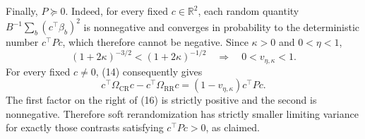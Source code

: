 Finally, \(P\succeq0\).  Indeed, for every fixed \(c\in\mathbb R^2\), each random quantity
\(
 B^{-1}\sum_b(c^\top\beta_b)^2
\)
is nonnegative and converges in probability to the deterministic number \(c^\top Pc\), which therefore cannot be negative.  Since \(\kappa>0\) and \(0<\eta<1\),
\[
 (1+2\kappa)^{-3/2}<(1+2\kappa)^{-1/2}
 \quad\Longrightarrow\quad
 0<v_{\eta,\kappa}<1.                                                     \tag{15}
\]
For every fixed \(c\ne0\), (14) consequently gives
\[
 c^\top\Omega_{\mathrm{CR}}c-c^\top\Omega_{\mathrm{RR}}c
 =(1-v_{\eta,\kappa})c^\top Pc.                                         \tag{16}
\]
The first factor on the right of (16) is strictly positive and the second is nonnegative.  Therefore soft rerandomization has strictly smaller limiting variance for exactly those contrasts satisfying \(c^\top Pc>0\), as claimed.